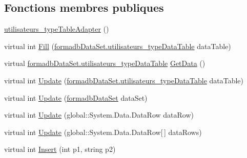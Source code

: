 \subsection*{Fonctions membres publiques}
\begin{DoxyCompactItemize}
\item 
\hyperlink{classforma_1_1formadb_data_set_table_adapters_1_1utilisateurs__type_table_adapter_a53750092d6b6d178fbde3a07e772e840}{utilisateurs\+\_\+type\+Table\+Adapter} ()
\item 
virtual int \hyperlink{classforma_1_1formadb_data_set_table_adapters_1_1utilisateurs__type_table_adapter_a9cf7e3ebcf71b7d46cb0af7fc8c59521}{Fill} (\hyperlink{classforma_1_1formadb_data_set_1_1utilisateurs__type_data_table}{formadb\+Data\+Set.\+utilisateurs\+\_\+type\+Data\+Table} data\+Table)
\item 
virtual \hyperlink{classforma_1_1formadb_data_set_1_1utilisateurs__type_data_table}{formadb\+Data\+Set.\+utilisateurs\+\_\+type\+Data\+Table} \hyperlink{classforma_1_1formadb_data_set_table_adapters_1_1utilisateurs__type_table_adapter_a0d9c23186deb07d5c4a8709e5dd46c47}{Get\+Data} ()
\item 
virtual int \hyperlink{classforma_1_1formadb_data_set_table_adapters_1_1utilisateurs__type_table_adapter_a930b80ff2748f6cebe462a0f00bdff2d}{Update} (\hyperlink{classforma_1_1formadb_data_set_1_1utilisateurs__type_data_table}{formadb\+Data\+Set.\+utilisateurs\+\_\+type\+Data\+Table} data\+Table)
\item 
virtual int \hyperlink{classforma_1_1formadb_data_set_table_adapters_1_1utilisateurs__type_table_adapter_ac060885dbd1b6201f1a19428c4a865e1}{Update} (\hyperlink{classforma_1_1formadb_data_set}{formadb\+Data\+Set} data\+Set)
\item 
virtual int \hyperlink{classforma_1_1formadb_data_set_table_adapters_1_1utilisateurs__type_table_adapter_a0f97dc645d5d5e136390f1a853a941c8}{Update} (global\+::\+System.\+Data.\+Data\+Row data\+Row)
\item 
virtual int \hyperlink{classforma_1_1formadb_data_set_table_adapters_1_1utilisateurs__type_table_adapter_a554a852a51707d96d0595e1b7dc0fbde}{Update} (global\+::\+System.\+Data.\+Data\+Row\mbox{[}$\,$\mbox{]} data\+Rows)
\item 
virtual int \hyperlink{classforma_1_1formadb_data_set_table_adapters_1_1utilisateurs__type_table_adapter_a63cd6a38bd8dc97b3763e0e27b5e6ec2}{Insert} (int p1, string p2)
\end{DoxyCompactItemize}
